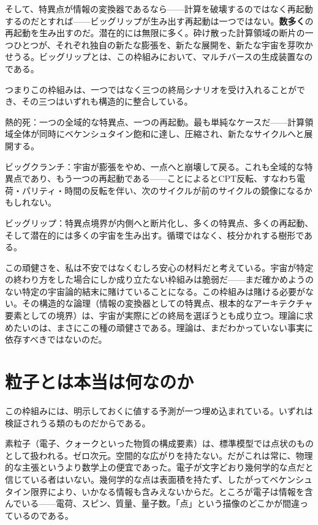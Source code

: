 \documentclass[11pt, twoside, openright]{book}
\begin{document}
そして、特異点が情報の変換器であるなら------計算を破壊するのではなく再起動するのだとすれば------ビッグリップが生み出す再起動は一つではない。\textbf{数多く}の再起動を生み出すのだ。潜在的には無限に多く。砕け散った計算領域の断片の一つひとつが、それぞれ独自の新たな膨張を、新たな展開を、新たな宇宙を芽吹かせうる。ビッグリップとは、この枠組みにおいて、マルチバースの生成装置なのである。

つまりこの枠組みは、一つではなく三つの終局シナリオを受け入れることができ、その三つはいずれも構造的に整合している。

熱的死：一つの全域的な特異点、一つの再起動。最も単純なケースだ------計算領域全体が同時にベケンシュタイン飽和に達し、圧縮され、新たなサイクルへと展開する。

ビッグクランチ：宇宙が膨張をやめ、一点へと崩壊して戻る。これも全域的な特異点であり、もう一つの再起動である------ことによるとCPT反転、すなわち電荷・パリティ・時間の反転を伴い、次のサイクルが前のサイクルの鏡像になるかもしれない。

ビッグリップ：特異点境界が内側へと断片化し、多くの特異点、多くの再起動、そして潜在的には多くの宇宙を生み出す。循環ではなく、枝分かれする樹形である。

この頑健さを、私は不安ではなくむしろ安心の材料だと考えている。宇宙が特定の終わり方をした場合にしか成り立たない枠組みは脆弱だ------まだ確かめようのない特定の宇宙論的結末に賭けていることになる。この枠組みは賭ける必要がない。その構造的な論理（情報の変換器としての特異点、根本的なアーキテクチャ要素としての境界）は、宇宙が実際にどの終局を選ぼうとも成り立つ。理論に求めたいのは、まさにこの種の頑健さである。理論は、まだわかっていない事実に依存すべきではないのだ。


\section*{粒子とは本当は何なのか}

この枠組みには、明示しておくに値する予測が一つ埋め込まれている。いずれは検証されうる類のものだからである。

素粒子（電子、クォークといった物質の構成要素）は、標準模型では点状のものとして扱われる。ゼロ次元。空間的な広がりを持たない。だがこれは常に、物理的な主張というより数学上の便宜であった。電子が文字どおり幾何学的な点だと信じている者はいない。幾何学的な点は表面積を持たず、したがってベケンシュタイン限界により、いかなる情報も含みえないからだ。ところが電子は情報を含んでいる------電荷、スピン、質量、量子数。「点」という描像のどこかが間違っているのである。
\end{document}
